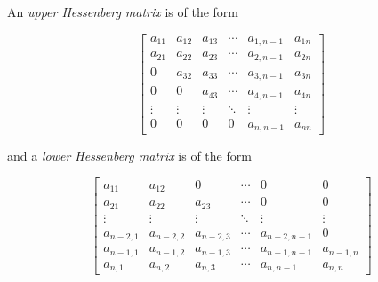 \documentclass{article}
\begin{document}
An \emph{upper Hessenberg matrix} is of the form

$$ \begin{bmatrix}
a_{11} & a_{12} & a_{13} & \cdots & a_{1,n-1} & a_{1n} \\
a_{21} & a_{22} & a_{23} & \cdots & a_{2,n-1} & a_{2n} \\
  0    & a_{32} & a_{33} & \cdots & a_{3,n-1} & a_{3n} \\
  0    &   0    & a_{43} & \cdots & a_{4,n-1} & a_{4n} \\
\vdots & \vdots & \vdots & \ddots & \vdots    & \vdots \\
  0    &    0   &    0   &   0    & a_{n,n-1} & a_{nn} 
\end{bmatrix} $$

and a \emph{lower Hessenberg matrix} is of the form

$$ \begin{bmatrix}
a_{11} & a_{12} & 0      & \cdots &   0       &  0     \\
a_{21} & a_{22} & a_{23} & \cdots &   0       &  0     \\
\vdots & \vdots & \vdots & \ddots & \vdots    & \vdots \\
a_{n-2,1} & a_{n-2,2} & a_{n-2,3} & \cdots & a_{n-2,n-1} & 0 \\
a_{n-1,1} & a_{n-1,2} & a_{n-1,3} & \cdots & a_{n-1,n-1} & a_{n-1,n} \\
a_{n,1} & a_{n,2} & a_{n,3} & \cdots & a_{n,n-1} & a_{n,n} 
\end{bmatrix} $$
\end{document}
